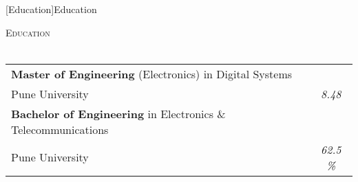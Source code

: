 \documentclass[a4paper]{article}
\newcommand{\lineunder} {
    \vspace*{-8pt} \\
    \hspace*{-18pt} \hrulefill \\
}
\newcommand{\header} [1] {
    {\hspace*{-18pt}\vspace*{6pt} \textsc{#1}}
    \vspace*{-6pt} \lineunder
}
\begin{document}
[Education]{Education}
\header{Education}
\vspace{1mm}
\bgroup
\def\arraystretch{1.2}
\begin{tabularx}{\textwidth}{ | X | c | }
	\hline

	\textbf{Master of Engineering} (Electronics) in Digital Systems       &                  \\
	Pune University                                                       & \textit{8.48}    \\
	\hline

	\textbf{Bachelor of Engineering} in Electronics \& Telecommunications &                  \\
	Pune University                                                       & \textit{62.5 \%} \\
	\hline
\end{tabularx}
\egroup
\vspace{2mm}
\end{document}
